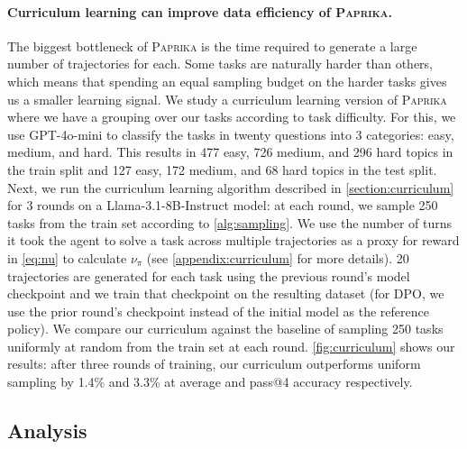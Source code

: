 \documentclass{article}
\newcommand{\ours}[1]{\textsc{Paprika}}
\theoremstyle{plain}
\theoremstyle{definition}
\theoremstyle{remark}
\begin{document}
\paragraph{Curriculum learning can improve data efficiency of \ours{}.}
The biggest bottleneck of \ours{} is the time required to generate a large number of trajectories for each.
Some tasks are naturally harder than others, which means that spending an equal sampling budget on the harder tasks gives us a smaller learning signal.
We study a curriculum learning version of \ours{} where we have a grouping over our tasks according to task difficulty. For this, we use GPT-4o-mini to classify the tasks in twenty questions into 3 categories: easy, medium, and hard. This results in 477 easy, 726 medium, and 296 hard topics in the train split and 127 easy, 172 medium, and 68 hard topics in the test split.
Next, we run the curriculum learning algorithm described in \cref{section:curriculum} for 3 rounds on a Llama-3.1-8B-Instruct model: at each round, we sample 250 tasks from the train set according to \cref{alg:sampling}. We use the number of turns it took the agent to solve a task across multiple trajectories as a proxy for reward in \cref{eq:nu} to calculate $\nu_{\pi}$ (see \cref{appendix:curriculum} for more details). 20 trajectories are generated for each task using the previous round's model checkpoint and we train that checkpoint on the resulting dataset (for DPO, we use the prior round's checkpoint instead of the initial model as the reference policy). We compare our curriculum against the baseline of sampling 250 tasks uniformly at random from the train set at each round. \cref{fig:curriculum} shows our results: after three rounds of training, our curriculum outperforms uniform sampling by 1.4\% and 3.3\% at average and pass@4 accuracy respectively.
\subsection{Analysis}
\end{document}
